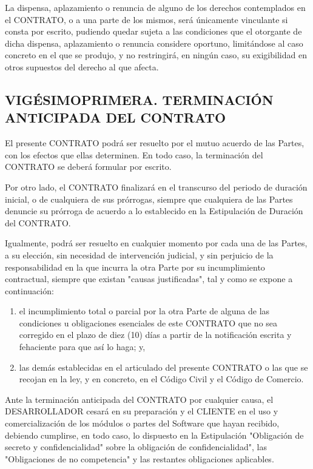 \documentclass[a4paper,11pt]{report}
\begin{document}
	La dispensa, aplazamiento o renuncia de alguno de los derechos
	contemplados en el CONTRATO, o a una parte de los mismos, será
	únicamente vinculante si consta por escrito, pudiendo quedar sujeta a
	las condiciones que el otorgante de dicha dispensa, aplazamiento o
	renuncia considere oportuno, limitándose al caso concreto en el que se
	produjo, y no restringirá, en ningún caso, su exigibilidad en otros
	supuestos del derecho al que afecta.

	\subsection*{VIGÉSIMOPRIMERA. TERMINACIÓN ANTICIPADA DEL CONTRATO}

	El presente CONTRATO podrá ser resuelto por el mutuo acuerdo de las
	Partes, con los efectos que ellas determinen. En todo caso, la
	terminación del CONTRATO se deberá formular por escrito.

	Por otro lado, el CONTRATO finalizará en el transcurso del periodo de
	duración inicial, o de cualquiera de sus prórrogas, siempre que
	cualquiera de las Partes denuncie su prórroga de acuerdo a lo
	establecido en la Estipulación de Duración del CONTRATO.

	Igualmente, podrá ser resuelto en cualquier momento por cada una de las
	Partes, a su elección, sin necesidad de intervención judicial, y sin
	perjuicio de la responsabilidad en la que incurra la otra Parte por su
	incumplimiento contractual, siempre que existan "causas justificadas",
	tal y como se expone a continuación:

	\begin{enumerate}[label=\Alph*)]
		\item el incumplimiento total o parcial por la otra Parte de alguna de las
		condiciones u obligaciones esenciales de este CONTRATO que no sea
		corregido en el plazo de diez (10) días a partir de la notificación
		escrita y fehaciente para que así lo haga; y,

		\item las demás establecidas en el articulado del presente CONTRATO o las
		que se recojan en la ley, y en concreto, en el Código Civil y el Código
		de Comercio.
	\end{enumerate}

	Ante la terminación anticipada del CONTRATO por cualquier causa, el
	DESARROLLADOR cesará en su preparación y el CLIENTE en el uso y
	comercialización de los módulos o partes del Software que hayan
	recibido, debiendo cumplirse, en todo caso, lo dispuesto en la
	Estipulación "Obligación de secreto y confidencialidad" sobre la
	obligación de confidencialidad", las "Obligaciones de no competencia" y
	las restantes obligaciones aplicables.
\end{document}
